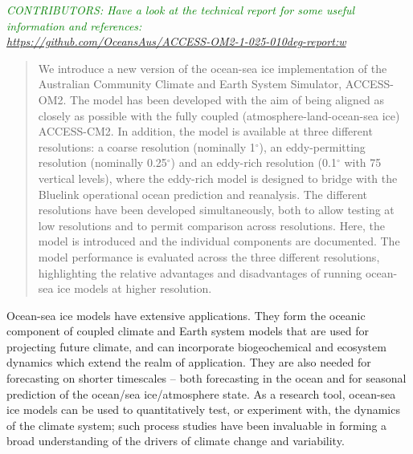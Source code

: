 \documentclass[gmd, manuscript]{copernicus}
\newcommand{\CONTRIBUTORS}[1]{\textcolor{green}{\textsf{\textsl{CONTRIBUTORS: #1}}}}
\begin{document}


\maketitle

\CONTRIBUTORS{Have a look at the technical report for some useful information and references:\\
\url{https://github.com/OceansAus/ACCESS-OM2-1-025-010deg-report:w
}}

\begin{abstract}
We introduce a new version of the ocean-sea ice implementation of the Australian Community Climate and Earth System Simulator, ACCESS-OM2.
The model has been developed with the aim of being aligned as closely as possible with the fully coupled (atmosphere-land-ocean-sea ice) ACCESS-CM2.
In addition, the model is available at three different resolutions: a coarse resolution (nominally 1$^\circ$), an eddy-permitting resolution (nominally 0.25$^\circ$) and an eddy-rich resolution (0.1$^\circ$ with 75 vertical levels), where the eddy-rich model is designed to bridge with the Bluelink operational ocean prediction and reanalysis.
The different resolutions have been developed simultaneously, both to allow testing at low resolutions and to permit comparison across resolutions.
Here, the model is introduced and the individual components are documented. 
The model performance is evaluated across the three different resolutions, highlighting the relative advantages and disadvantages of running ocean-sea ice models at higher resolution.
\end{abstract}



\introduction  %

Ocean-sea ice models have extensive applications.
They form the oceanic component of coupled climate and Earth system models that are used for projecting future climate, and can incorporate biogeochemical and ecosystem dynamics which extend the realm of application.
They are also needed for forecasting on shorter timescales -- both forecasting in the ocean and for seasonal prediction of the ocean/sea ice/atmosphere state.
As a research tool, ocean-sea ice models can be used to quantitatively test, or experiment with, the dynamics of the climate system; such process studies have been invaluable in forming a broad understanding of the drivers of climate change and variability.
\end{document}
